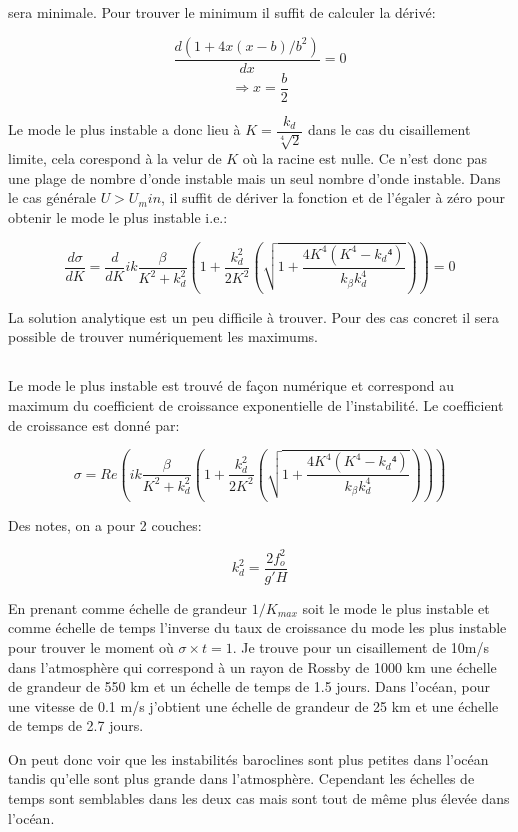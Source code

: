 \documentclass[11pt,a4paper,titlepage]{article}
\begin{document}
sera minimale. Pour trouver le minimum il suffit de calculer la dérivé:

\begin{equation}
\dfrac{d (1 + 4 x (x-b)/b^2
)}{dx} = 0
\end{equation}
\begin{equation} 
\Rightarrow x=\dfrac{b}{2}
\end{equation}

Le mode le plus instable a donc lieu à $K=\dfrac{k_d}{\sqrt[4]{2}}$ dans le cas du cisaillement limite, cela corespond à la velur de $K$ où la racine est nulle. Ce n'est donc pas une plage de nombre d'onde instable mais un seul nombre d'onde instable. Dans le cas générale $U>U_min$, il suffit de dériver la fonction et de l'égaler à zéro pour obtenir le mode le plus instable i.e.:

\begin{equation}
\dfrac{d\sigma}{dK}=\dfrac{d}{dK}ik\dfrac{\beta}{K^2+k_d^2}\left(1+\dfrac{k_d^2}{2K^2}\left(\sqrt{1+\dfrac{4K^4(K^4-k_d⁴)}{k_{\beta}k_d^4}}\right)\right) = 0
\end{equation} 

La solution analytique est un peu difficile à trouver. Pour des cas concret il sera possible de trouver numériquement les maximums.

\subsection{}

Le mode le plus instable est trouvé de façon numérique et correspond au maximum du coefficient de croissance exponentielle de l'instabilité. Le coefficient de croissance est donné par:

\begin{equation}
\sigma=Re(ik\dfrac{\beta}{K^2+k_d^2}\left(1+\dfrac{k_d^2}{2K^2}\left(\sqrt{1+\dfrac{4K^4(K^4-k_d⁴)}{k_{\beta}k_d^4}}\right)\right)) 
\end{equation} 


Des notes, on a pour 2 couches:

\begin{equation}
k_d^2 =\dfrac{2f_o^2}{g'H}
\end{equation}

En prenant comme échelle de grandeur $1/K_{max}$ soit le mode le plus instable et comme échelle de temps l'inverse du taux de croissance du mode les plus instable pour trouver le moment où $\sigma \times t = 1$. Je trouve pour un cisaillement de 10m/s dans l'atmosphère qui correspond à un rayon de Rossby de 1000 km une échelle de grandeur de 550 km et un échelle de temps de 1.5 jours. Dans l'océan, pour une vitesse de 0.1 m/s j'obtient une échelle de grandeur de 25 km et une échelle de temps de 2.7 jours. 

On peut donc voir que les instabilités baroclines sont plus petites dans l'océan tandis qu'elle sont plus grande dans l'atmosphère. Cependant les échelles de temps sont semblables dans les deux cas mais sont tout de même plus élevée dans l'océan.  
\end{document}
